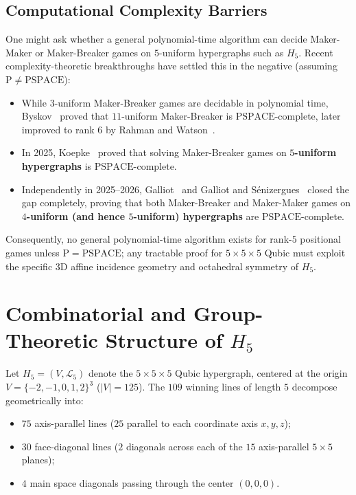 \documentclass[11pt,a4paper]{article}
\theoremstyle{definition}
\theoremstyle{remark}
\begin{document}
\subsection{Computational Complexity Barriers}
One might ask whether a general polynomial-time algorithm can decide Maker-Maker or Maker-Breaker games on $5$-uniform hypergraphs such as $H_5$. Recent complexity-theoretic breakthroughs have settled this in the negative (assuming $\mathrm{P} \neq \mathrm{PSPACE}$):
\begin{itemize}[noitemsep]
    \item While $3$-uniform Maker-Breaker games are decidable in polynomial time, Byskov~\cite{Byskov2004} proved that $11$-uniform Maker-Breaker is $\mathrm{PSPACE}$-complete, later improved to rank $6$ by Rahman and Watson~\cite{RahmanWatson2023}.
    \item In 2025, Koepke~\cite{Koepke2025} proved that solving Maker-Breaker games on \textbf{$5$-uniform hypergraphs} is $\mathrm{PSPACE}$-complete.
    \item Independently in 2025--2026, Galliot~\cite{Galliot2025} and Galliot and S\'enizergues~\cite{GalliotSenizergues2026} closed the gap completely, proving that both Maker-Breaker and Maker-Maker games on \textbf{$4$-uniform (and hence $5$-uniform) hypergraphs} are $\mathrm{PSPACE}$-complete.
\end{itemize}
Consequently, no general polynomial-time algorithm exists for rank-$5$ positional games unless $\mathrm{P} = \mathrm{PSPACE}$; any tractable proof for $5 \times 5 \times 5$ Qubic must exploit the specific $3\text{D}$ affine incidence geometry and octahedral symmetry of $H_5$.

\section{Combinatorial and Group-Theoretic Structure of $H_5$}

Let $H_5 = (V, \mathcal{L}_5)$ denote the $5 \times 5 \times 5$ Qubic hypergraph, centered at the origin $V = \{-2, -1, 0, 1, 2\}^3$ ($|V| = 125$). The $109$ winning lines of length $5$ decompose geometrically into:
\begin{itemize}[noitemsep]
    \item $75$ axis-parallel lines ($25$ parallel to each coordinate axis $x, y, z$);
    \item $30$ face-diagonal lines ($2$ diagonals across each of the $15$ axis-parallel $5 \times 5$ planes);
    \item $4$ main space diagonals passing through the center $(0,0,0)$.
\end{itemize}
\end{document}

